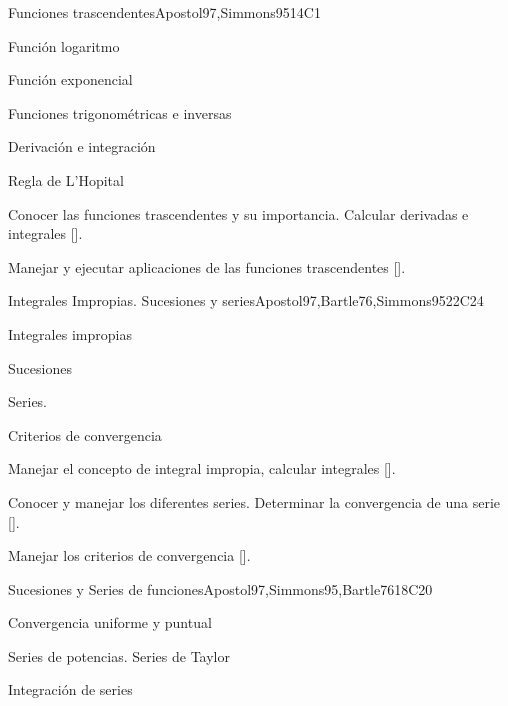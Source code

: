 \begin{syllabus}
\begin{unit}{}{Funciones trascendentes}{Apostol97,Simmons95}{14}{C1}
   \begin{topics}
      \item Función logaritmo
      \item Función exponencial
      \item Funciones trigonométricas e inversas
      \item Derivación e integración
      \item Regla de L'Hopital
   \end{topics}

   \begin{learningoutcomes}
      \item Conocer las funciones trascendentes y su importancia. Calcular derivadas e integrales [\Usage].
      \item Manejar y ejecutar aplicaciones de las funciones trascendentes [\Usage].
      \end{learningoutcomes}
\end{unit}

\begin{unit}{}{Integrales Impropias. Sucesiones y series}{Apostol97,Bartle76,Simmons95}{22}{C24}
   \begin{topics}
      \item Integrales impropias
      \item Sucesiones
      \item Series.
      \item Criterios de convergencia
   \end{topics}

   \begin{learningoutcomes}
      \item Manejar el concepto de integral impropia, calcular integrales [\Usage].
      \item Conocer y manejar los diferentes series. Determinar la convergencia de una serie [\Usage].
      \item Manejar los criterios de convergencia [\Usage].
      \end{learningoutcomes}
\end{unit}

\begin{unit}{}{Sucesiones y Series de funciones}{Apostol97,Simmons95,Bartle76}{18}{C20}
   \begin{topics}
      \item Convergencia uniforme y puntual
      \item Series de potencias. Series de Taylor
      \item Integración de series
   \end{topics}


\end{unit}
\end{syllabus}

